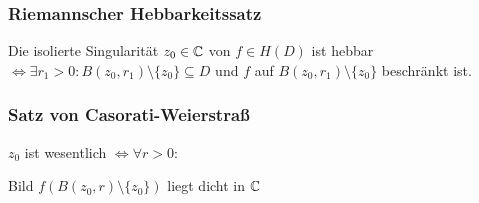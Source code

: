 \subsubsection*{Riemannscher Hebbarkeitssatz}

Die isolierte Singularität $z_0 \in \mathbb{C}$ von $f \in H(D)$ ist hebbar $\iff \exists r_1 > 0 : B(z_0,r_1) \setminus \{z_0\} \subseteq D$ und $f$ auf $B(z_0,r_1) \setminus \{z_0\}$ beschränkt ist.

\subsubsection*{Satz von Casorati-Weierstraß}

$z_0$ ist wesentlich $\iff \forall r > 0 :$

Bild $f(B(z_0,r) \setminus \{z_0\})$ liegt dicht in $\mathbb{C}$
